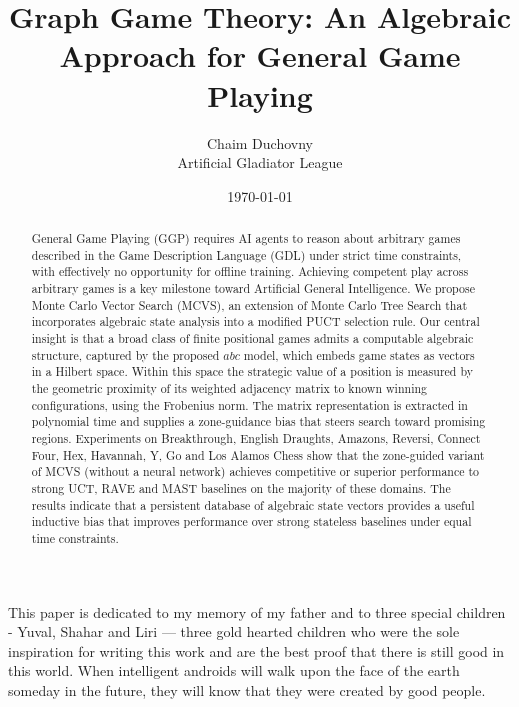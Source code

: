 \documentclass[11pt,a4paper]{article}
\title{Graph Game Theory: An Algebraic Approach for General Game Playing}
\author{Chaim Duchovny \\
        Artificial Gladiator League}
\date{\today}
\theoremstyle{plain}
\theoremstyle{definition}
\begin{document}
\maketitle

This paper is dedicated to my memory of my father and to three special children - Yuval, Shahar and Liri — three gold hearted children who were the sole inspiration for writing this work and are the best proof that there is still good in this world. When intelligent androids will walk upon the face of the earth someday in the future, they will know that they were created by good people.

\vspace{0.5em}


\vspace{0.5em}

\begin{abstract}

General Game Playing (GGP) requires AI agents to reason about arbitrary games described in the Game Description Language (GDL) under strict time constraints, with effectively no opportunity for offline training. Achieving competent play across arbitrary games is a key milestone toward Artificial General Intelligence. We propose Monte Carlo Vector Search (MCVS), an extension of Monte Carlo Tree Search that incorporates algebraic state analysis into a modified PUCT selection rule. Our central insight is that a broad class of finite positional games admits a computable algebraic structure, captured by the proposed \(abc\) model, which embeds game states as vectors in a Hilbert space. Within this space the strategic value of a position is measured by the geometric proximity of its weighted adjacency matrix to known winning configurations, using the Frobenius norm. The matrix representation is extracted in polynomial time and supplies a zone-guidance bias that steers search toward promising regions. Experiments on Breakthrough, English Draughts, Amazons, Reversi, Connect Four, Hex, Havannah, Y, Go and Los Alamos Chess show that the zone-guided variant of MCVS (without a neural network) achieves competitive or superior performance to strong UCT, RAVE and MAST baselines on the majority of these domains. The results indicate that a persistent database of algebraic state vectors provides a useful inductive bias that improves performance over strong stateless baselines under equal time constraints.

\end{abstract}
\end{document}
